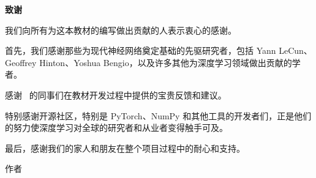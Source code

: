\newpage
\thispagestyle{empty}

\vspace*{2cm}

\begin{center}
    \Large\textbf{致谢}
\end{center}

\vspace{1.5cm}

我们向所有为这本教材的编写做出贡献的人表示衷心的感谢。

首先，我们感谢那些为现代神经网络奠定基础的先驱研究者，包括 Yann LeCun、Geoffrey Hinton、Yoshua Bengio，以及许多其他为深度学习领域做出贡献的学者。

感谢 \thesisSchool\ 的同事们在教材开发过程中提供的宝贵反馈和建议。

特别感谢开源社区，特别是 PyTorch、NumPy 和其他工具的开发者们，正是他们的努力使深度学习对全球的研究者和从业者变得触手可及。

最后，感谢我们的家人和朋友在整个项目过程中的耐心和支持。

\vspace{2cm}

\begin{flushright}
    作者\\
    \thesisDate
\end{flushright}

\newpage
